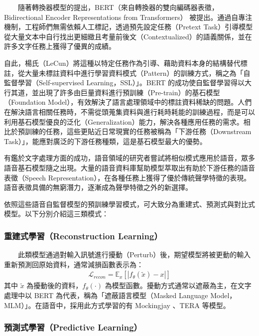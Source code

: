 　　隨著轉換器模型的提出，BERT（來自轉換器的雙向編碼器表徵，Bidirectional Encoder Representations from Transformers）\cite{devlin_bert_2019} 被提出。通過自專注機制，工程師們無需依賴人工標記，透過預先設定任務（Pretext Task）引導模型從大量文本中自行找出更細緻且考量前後文（Contextualized）的語義關係，並在許多文字任務上獲得了優異的成績。

        自此，楊氏（LeCun）將這種以特定任務作為引導、藉助資料本身的結構替代標註，從大量未標註資料中進行學習資料模式（Pattern）的訓練方式，稱之為「自監督學習（Self-supervised Learning，SSL）」。BERT 的成功使自監督學習得以大行其道，並出現了許多由巨量資料進行預訓練（Pre-train）的基石模型（Foundation Model），有效解決了語言處理領域中的標註資料稀缺的問題。人們在解決語言相關任務時，不需從頭蒐集資料與進行耗時耗能的訓練過程，而是可以利用基石模型優良的泛化（Generalization）能力，解決各種應用任務的需求。相比於預訓練的任務，這些更貼近日常現實的任務被稱為「下游任務（Downstream Task）」，能應對廣泛的下游任務種類，這是基石模型最大的優勢。

        有鑑於文字處理方面的成功，語音領域的研究者嘗試將相似模式應用於語音，眾多語音基石模型隨之出現。大量的語音資料庫幫助模型萃取出有助於下游任務的語音表徵（Speech Representation），在各種任務上獲得了優於傳統聲學特徵的表現。語音表徵具備的無窮潛力，逐漸成為聲學特徵之外的新選擇。

        依照這些語音自監督模型的預訓練學習模式，可大致分為重建式、預測式與對比式模型。以下分別介紹這三類模式：

\subsubsection{重建式學習（Reconstruction Learning）}

　　此類模型通過對輸入訊號進行擾動（Perturb）後，期望模型將被更動的輸入重新預測回原始資料，通常減損函數表示為：
\begin{align}
    \mathcal{L}_{recon} = \mathbb{E}_x[|f_\theta(\tilde{x}) - x|]
\end{align}
其中 $\tilde{x}$ 為擾動後的資料，$f_\theta(\cdot)$ 為模型函數。擾動方式通常以遮蔽為主，在文字處理中以 BERT 為代表，稱為「遮蔽語言模型（Masked Language Model，MLM）」。在語音中，採用此方式學習的有 Mockingjay \cite{liu_mockingjay_2019}、TERA \cite{t_tera_2021} 等模型。  %

\subsubsection{預測式學習（Predictive Learning）}

